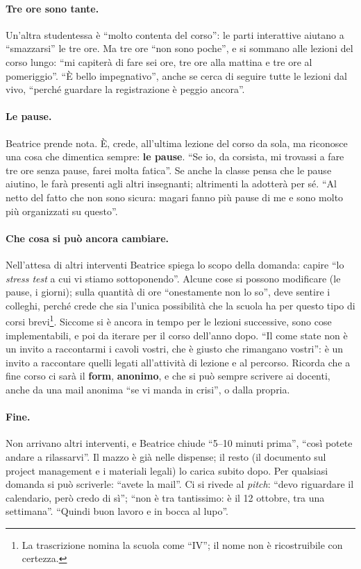 \paragraph{Tre ore sono tante.} Un'altra studentessa è ``molto contenta del corso'':
le parti interattive aiutano a ``smazzarsi'' le tre ore. Ma tre ore ``non sono poche'',
e si sommano alle lezioni del corso lungo: ``mi capiterà di fare sei ore, tre ore alla
mattina e tre ore al pomeriggio''. ``È bello impegnativo'', anche se cerca di seguire
tutte le lezioni dal vivo, ``perché guardare la registrazione è peggio ancora''.

\paragraph{Le pause.} Beatrice prende nota. È, crede, all'ultima lezione del corso da
sola, ma riconosce una cosa che dimentica sempre: \textbf{le pause}. ``Se io, da
corsista, mi trovassi a fare tre ore senza pause, farei molta fatica''. Se anche la
classe pensa che le pause aiutino, le farà presenti agli altri insegnanti; altrimenti
la adotterà per sé. ``Al netto del fatto che non sono sicura: magari fanno più pause di
me e sono molto più organizzati su questo''.

\paragraph{Che cosa si può ancora cambiare.} Nell'attesa di altri interventi Beatrice
spiega lo scopo della domanda: capire ``lo \emph{stress test} a cui vi stiamo
sottoponendo''. Alcune cose si possono modificare (le pause, i giorni); sulla quantità
di ore ``onestamente non lo so'', deve sentire i colleghi, perché crede che sia l'unica
possibilità che la scuola ha per questo tipo di corsi brevi\footnote{La trascrizione
nomina la scuola come ``IV''; il nome non è ricostruibile con certezza.}. Siccome si è
ancora in tempo per le lezioni successive, sono cose implementabili, e poi da iterare
per il corso dell'anno dopo. ``Il come state non è un invito a raccontarmi i cavoli
vostri, che è giusto che rimangano vostri'': è un invito a raccontare quelli legati
all'attività di lezione e al percorso. Ricorda che a fine corso ci sarà il
\textbf{form}, \textbf{anonimo}, e che si può sempre scrivere ai docenti, anche da una
mail anonima ``se vi manda in crisi'', o dalla propria.

\paragraph{Fine.} Non arrivano altri interventi, e Beatrice chiude ``5--10 minuti
prima'', ``così potete andare a rilassarvi''. Il mazzo è già nelle dispense; il resto
(il documento sul project management e i materiali legali) lo carica subito dopo. Per
qualsiasi domanda si può scriverle: ``avete la mail''. Ci si rivede al \emph{pitch}:
``devo riguardare il calendario, però credo di sì''; ``non è tra tantissimo: è il 12
ottobre, tra una settimana''. ``Quindi buon lavoro e in bocca al lupo''.

